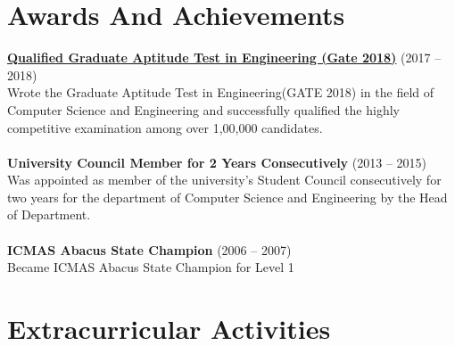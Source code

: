 \documentclass[margin,line]{res}
\begin{document}
\begin{resume}
\section{\sc Awards And Achievements}
{\bf \href{https://en.wikipedia.org/wiki/Graduate_Aptitude_Test_in_Engineering} {Qualified Graduate Aptitude Test in Engineering  (Gate 2018)}} \hfill (2017 -- 2018) \\
Wrote the Graduate Aptitude Test in Engineering(GATE 2018) in the field of Computer Science and Engineering and successfully qualified the highly competitive examination among over 1,00,000  candidates.  \\\\
{\bf University Council Member for 2 Years Consecutively} \hfill  (2013 -- 2015)\\
Was appointed as member of  the university's Student Council consecutively for two years for the department of Computer Science and Engineering by the Head of Department. \\\\
{\bf ICMAS Abacus State Champion} \hfill (2006 --  2007)\\
Became ICMAS Abacus State Champion for Level 1\\


\section{\sc Extracurricular Activities}


\end{resume}
\end{document}
